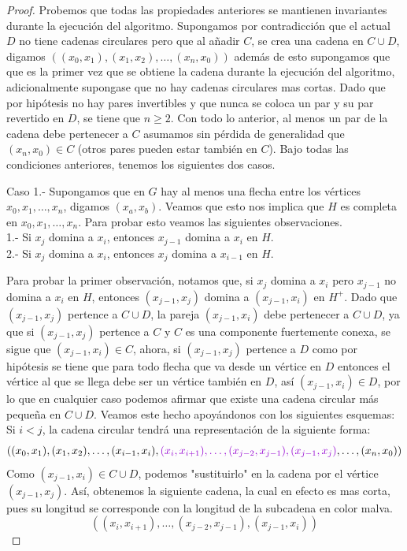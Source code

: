 \begin{proof}
  Probemos que todas las propiedades anteriores se mantienen invariantes durante la ejecuci\'on del algoritmo.
  Supongamos por contradicci\'on que el actual $D$ no tiene cadenas circulares pero que al añadir $C$, se crea una cadena en $C\cup D$, digamos $((x_0,x_1),(x_1,x_2),\dots, (x_n,x_0))$ adem\'as de esto supongamos que que es la primer vez que se obtiene la cadena durante la ejecuci\'on del algoritmo, adicionalmente supongase que no hay cadenas circulares mas cortas. Dado que por hip\'otesis no hay pares invertibles y que nunca se coloca un par y su par revertido en $D$, se tiene que $n\geq 2$. Con todo lo anterior, al menos un par de la cadena debe pertenecer a $C$ asumamos sin p\'erdida de generalidad que $(x_n,x_0)\in C$ (otros pares pueden estar tambi\'en en $C$).
  Bajo todas las condiciones anteriores, tenemos los siguientes dos casos.

  Caso 1.- Supongamos que en $G$ hay al menos una flecha entre los v\'ertices $x_0,x_1,\dots,x_n$, digamos $(x_a,x_b)$. Veamos que esto nos implica que $H$ es completa en $x_0,x_1,\dots,x_n$. Para probar esto veamos las siguientes observaciones. \\
  1.- Si $x_j$ domina a $x_i$, entonces $x_{j-1}$ domina a $x_i$ en $H$.\\
  2.- Si $x_j$ domina a $x_i$, entonces $x_j$ domina a $x_{i-1}$ en $H$.

  Para probar la primer observaci\'on, notamos que, si $x_j$ domina a $x_i$ pero $x_{j-1}$ no domina a $x_i$ en $H$, entonces $(x_{j-1},x_j)$ domina a $(x_{j-1},x_i)$ en $H^+$. Dado que $(x_{j-1},x_j)$ pertence a $C\cup D$, la pareja $(x_{j-1},x_i) $ debe pertenecer a $C\cup D$, ya que si $(x_{j-1},x_j)$ pertence a $C$ y $C$ es una componente fuertemente conexa, se sigue que $(x_{j-1},x_i)\in C$, ahora, si $(x_{j-1},x_j)$ pertence a $D$ como por hip\'otesis se tiene que para todo flecha que va desde un v\'ertice en $D$ entonces el v\'ertice al que se llega debe ser un v\'ertice tambi\'en en $D$, así $(x_{j-1},x_i)\in D$, por lo que en cualquier caso podemos afirmar que existe una cadena circular m\'as pequeña en $C\cup D$. Veamos este hecho apoy\'andonos con los siguientes esquemas:
Si $i<j$, la cadena circular tendr\'a una representaci\'on de la siguiente forma:
$$( (x_0,x_1),(x_1,x_2),\dots, (x_{i-1},x_i), {\color{malva}(x_i,x_{i+1}),\dots, (x_{j-2},x_{j-1}),(x_{j-1},x_{j})}, \dots , (x_n,x_0)   )$$
Como $(x_{j-1},x_i) \in C\cup D$, podemos "sustituirlo" en la cadena por el v\'ertice $(x_{j-1},x_{j})$. Así, obtenemos la siguiente cadena, la cual en efecto es mas corta, pues su longitud se corresponde con la longitud de la subcadena en color malva.
$$ ((x_i,x_{i+1}),\dots, (x_{j-2},x_{j-1}),(x_{j-1},x_i)) $$ 


\end{proof}
